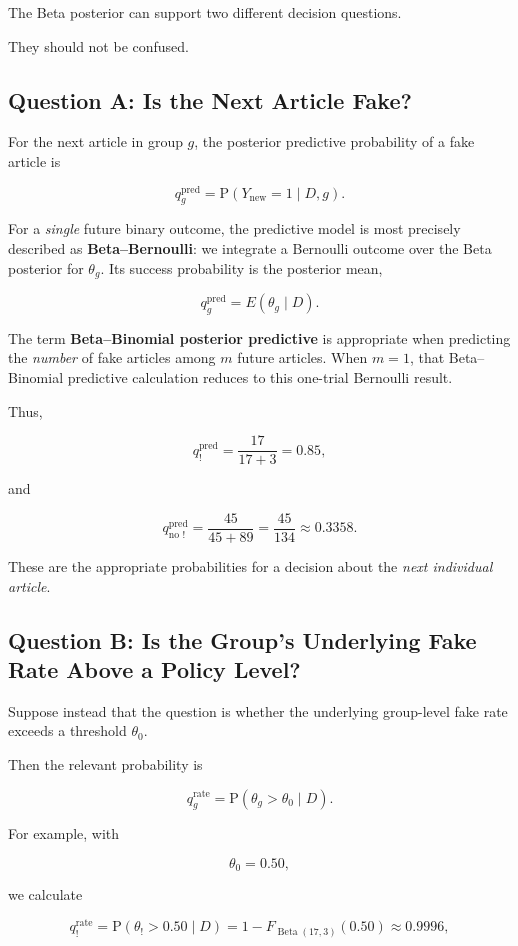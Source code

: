 \documentclass[11pt]{article}
\newcommand{\Prob}{\mathrm{P}}
\begin{document}
The Beta posterior can support two different decision questions.

They should not be confused.

\subsection{Question A: Is the Next Article Fake?}

For the next article in group $g$, the posterior predictive probability of a fake article is

\[
q_g^{\mathrm{pred}}
=
\Prob(Y_{\mathrm{new}}=1\mid D,g).
\]

For a \emph{single} future binary outcome, the predictive model is most precisely described as \textbf{Beta--Bernoulli}: we integrate a Bernoulli outcome over the Beta posterior for $\theta_g$. Its success probability is the posterior mean,

\[
q_g^{\mathrm{pred}}
=
E(\theta_g\mid D).
\]

The term \textbf{Beta--Binomial posterior predictive} is appropriate when predicting the \emph{number} of fake articles among $m$ future articles. When $m=1$, that Beta--Binomial predictive calculation reduces to this one-trial Bernoulli result.

Thus,

\[
q_{!}^{\mathrm{pred}}
=
\frac{17}{17+3}
=
0.85,
\]

and

\[
q_{\text{no }!}^{\mathrm{pred}}
=
\frac{45}{45+89}
=
\frac{45}{134}
\approx
0.3358.
\]

These are the appropriate probabilities for a decision about the \emph{next individual article}.

\subsection{Question B: Is the Group's Underlying Fake Rate Above a Policy Level?}

Suppose instead that the question is whether the underlying group-level fake rate exceeds a threshold $\theta_0$.

Then the relevant probability is

\[
q_g^{\mathrm{rate}}
=
\Prob(\theta_g>\theta_0\mid D).
\]

For example, with

\[
\theta_0=0.50,
\]

we calculate

\[
q_{!}^{\mathrm{rate}}
=
\Prob(\theta_{!}>0.50\mid D)
=
1-F_{\operatorname{Beta}(17,3)}(0.50)
\approx
0.9996,
\]
\end{document}
